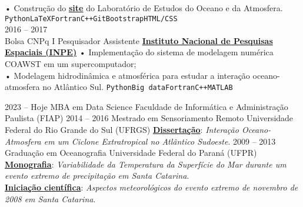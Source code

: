 \documentclass[9pt]{developercv} %
\begin{document}
\begin{entrylist}
{		• Construção do \href{https://loa-inpe.github.io/}{\textcolor{bleu_cite}{\textbf{site}}} do Laboratório de Estudos do Oceano e da Atmosfera. \\
		\texttt{Python}\slashsep\texttt{LaTeX}\slashsep\texttt{Fortran}\slashsep\texttt{C++}\slashsep\texttt{Git}\slashsep\texttt{Bootstrap}\slashsep\texttt{HTML/CSS}}
		\\\entry
		{2016 -- 2017\\\footnotesize{Bolsa CNPq I}}
		{Pesquisador Assistente}
		{\href{https://www.gov.br/inpe/pt-br}{\textcolor{bleu_cite}{\textbf{Instituto Nacional de Pesquisas Espaciais (INPE)}}}}
		{•  Implementação do sistema de modelagem numérica COAWST em um supercomputador; \\
		 • Modelagem hidrodinâmica e atmosférica para estudar a interação oceano-atmosfera no Atlântico Sul. 
		\texttt{Python}\slashsep\texttt{Big data}\slashsep\texttt{Fortran}\slashsep\texttt{C++}\slashsep\texttt{MATLAB}}
\end{entrylist}

\vspace{-0.5cm}

\begin{entrylist}
	\entry
		{2023 -- Hoje}
		{MBA em Data Science}
		{Faculdade de Informática e Administração Paulista (FIAP)}
		{}
		\entry
		{2014 -- 2016}
		{Mestrado em Sensoriamento Remoto}
		{Universidade Federal do Rio Grande do Sul (UFRGS)}
		{\href{https://lume.ufrgs.br/handle/10183/171223}{\textcolor{bleu_cite}{\textbf{Dissertação}}}: \textit{Interação Oceano-Atmosfera em um Ciclone Extratropical no Atlântico Sudoeste}.}
	\entry
		{2009 -- 2013}
		{Graduação em Oceanografia}
		{Universidade Federal do Paraná (UFPR)}
		{\href{http://doi.org/10.13140/RG.2.2.15184.35847}{\textcolor{bleu_cite}{\textbf{Monografia}}}: \textit{Variabilidade da Temperatura da Superfície do Mar durante um evento extremo de precipitação em Santa Catarina}. 
		\\ \href{http://doi.org/10.13140/RG.2.2.25250.68800}{\textcolor{bleu_cite}{\textbf{Iniciação científica}}}: \textit{Aspectos meteorológicos do evento extremo de novembro de 2008 em Santa Catarina}.
		}
\end{entrylist}

\vspace{-0.4cm}
\end{document}
